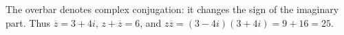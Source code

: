 The overbar denotes complex conjugation: it changes the sign of the imaginary part. Thus $\overline z=\boxed{3+4i}$, $z+\overline z=\boxed{6}$, and $z\overline z=(3-4i)(3+4i)=9+16=\boxed{25}$.
